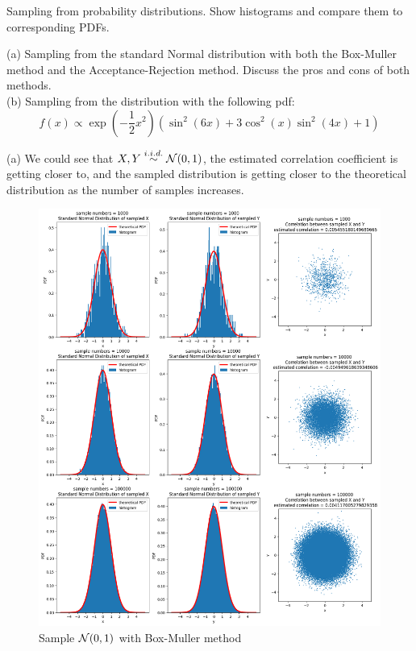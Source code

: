 \begin{homeworkProblem}

Sampling from probability distributions. Show histograms and compare them to corresponding PDFs.

(a) Sampling from the standard Normal distribution with both the Box-Muller method and the Acceptance-Rejection method. Discuss the pros and cons of both methods. \\
(b) Sampling from the distribution with the following pdf:
$$f(x) \propto \exp \left(-\frac{1}{2} x^2\right)\left(\sin ^2(6 x)+3 \cos ^2(x) \sin ^2(4 x)+1\right)$$

\solution

(a)
We could see that $X,Y\stackrel{i.i.d.}{\sim}\mathcal{N}(0,1)$, the estimated correlation coefficient is getting closer to, and the sampled distribution is getting closer to the theoretical distribution as the number of samples increases.\\

\begin{figure}[h]
    \centering
    \includegraphics[height=0.55\textheight]{./figure/p5/box_muller.png}
    \caption{Sample $\mathcal{N}(0,1)$ with Box-Muller method}
\end{figure}



\end{homeworkProblem}
